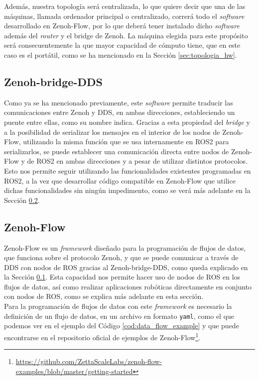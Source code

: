 Además, nuestra topología será centralizada, lo que quiere decir que una de las
máquinas, llamada ordenador principal o centralizado, correrá todo el
\textit{software} desarrollado en Zenoh-Flow, por lo que deberá tener instalado
dicho \textit{software} además del \textit{router} y el bridge de Zenoh.
La máquina elegida para este propósito será consecuentemente la que mayor
capacidad de cómputo tiene, que en este caso es el portátil, como se ha
mencionado en la Sección \ref{sec:topologia_hw}.


\subsection{Zenoh-bridge-DDS}
\label{sec:zenoh_bridge}

Como ya se ha mencionado previamente, este \textit{software} permite traducir
las comunicaciones entre Zenoh y DDS, en ambas direcciones, estableciendo un
puente entre ellas, como su nombre indica.
Gracias a esta propiedad del \textit{bridge} y a la posibilidad de serializar
los mensajes en el interior de los nodos de Zenoh-Flow, utilizando la misma
función que se usa internamente en ROS2 para serializarlos, se puede establecer
una comunicación directa entre nodos de Zenoh-Flow y de ROS2 en ambas
direcciones y a pesar de utilizar distintos protocolos.
\\

Esto nos permite seguir utilizando las funcionalidades existentes programadas
en ROS2, a la vez que desarrollar código compatible en Zenoh-Flow que utilice
dichas funcionalidades sin ningún impedimento, como se verá más adelante en la
Sección \ref{sec:zenoh_flow}.
\\


\subsection{Zenoh-Flow}
\label{sec:zenoh_flow}

Zenoh-Flow es un \textit{framework} diseñado para la programación de flujos de
datos, que funciona sobre el protocolo Zenoh, y que se puede comunicar a través
de DDS con nodos de ROS gracias al Zenoh-bridge-DDS, como queda explicado en la
Sección \ref{sec:zenoh_bridge}.
Esta capacidad nos permite hacer uso de nodos de ROS en los flujos de datos, así
como realizar aplicaciones robóticas directamente en conjunto con nodos de ROS,
como se explica más adelante en esta sección.
\\

Para la programación de flujos de datos con este \textit{framework} es necesario
la definición de un flujo de datos, en un archivo en formato \texttt{yaml}, como
el que podemos ver en el ejemplo del Código \ref{cod:data_flow_example} y que
puede encontrarse en el repositorio oficial de ejemplos de Zenoh-Flow\footnote{
\url{https://github.com/ZettaScaleLabs/zenoh-flow-examples/blob/master/getting-started}}.
\\

